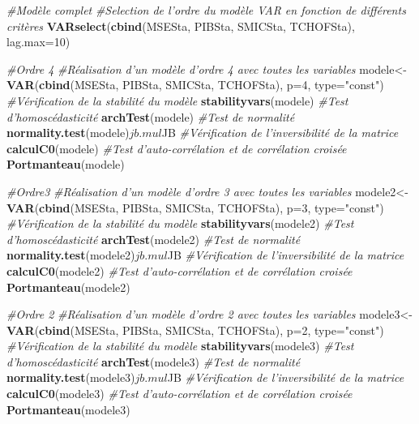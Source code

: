 \documentclass[11pt,]{article}
\newenvironment{Shaded}{\begin{snugshade}}{\end{snugshade}}
\newcommand{\KeywordTok}[1]{\textcolor[rgb]{0.13,0.29,0.53}{\textbf{{#1}}}}
\newcommand{\DataTypeTok}[1]{\textcolor[rgb]{0.13,0.29,0.53}{{#1}}}
\newcommand{\DecValTok}[1]{\textcolor[rgb]{0.00,0.00,0.81}{{#1}}}
\newcommand{\StringTok}[1]{\textcolor[rgb]{0.31,0.60,0.02}{{#1}}}
\newcommand{\CommentTok}[1]{\textcolor[rgb]{0.56,0.35,0.01}{\textit{{#1}}}}
\newcommand{\NormalTok}[1]{{#1}}
\begin{document}
\begin{Shaded}
\begin{Highlighting}[]
\CommentTok{#Modèle complet}
\CommentTok{#Selection de l'ordre du modèle VAR en fonction de différents critères}
\KeywordTok{VARselect}\NormalTok{(}\KeywordTok{cbind}\NormalTok{(MSESta, PIBSta, SMICSta, TCHOFSta), }\DataTypeTok{lag.max=}\DecValTok{10}\NormalTok{)}

\CommentTok{#Ordre 4}
\CommentTok{#Réalisation d'un modèle d'ordre 4 avec toutes les variables}
\NormalTok{modele<-}\KeywordTok{VAR}\NormalTok{(}\KeywordTok{cbind}\NormalTok{(MSESta, PIBSta, SMICSta, TCHOFSta), }\DataTypeTok{p=}\DecValTok{4}\NormalTok{, }\DataTypeTok{type=}\StringTok{"const"}\NormalTok{)}
\CommentTok{#Vérification de la stabilité du modèle}
\KeywordTok{stabilityvars}\NormalTok{(modele)}
\CommentTok{#Test d'homoscédasticité}
\KeywordTok{archTest}\NormalTok{(modele)}
\CommentTok{#Test de normalité}
\KeywordTok{normality.test}\NormalTok{(modele)$jb.mul$JB}
\CommentTok{#Vérification de l'inversibilité de la matrice}
\KeywordTok{calculC0}\NormalTok{(modele)}
\CommentTok{#Test d'auto-corrélation et de corrélation croisée}
\KeywordTok{Portmanteau}\NormalTok{(modele)}

\CommentTok{#Ordre3}
\CommentTok{#Réalisation d'un modèle d'ordre 3 avec toutes les variables}
\NormalTok{modele2<-}\KeywordTok{VAR}\NormalTok{(}\KeywordTok{cbind}\NormalTok{(MSESta, PIBSta, SMICSta, TCHOFSta), }\DataTypeTok{p=}\DecValTok{3}\NormalTok{, }\DataTypeTok{type=}\StringTok{"const"}\NormalTok{)}
\CommentTok{#Vérification de la stabilité du modèle}
\KeywordTok{stabilityvars}\NormalTok{(modele2)}
\CommentTok{#Test d'homoscédasticité}
\KeywordTok{archTest}\NormalTok{(modele2)}
\CommentTok{#Test de normalité}
\KeywordTok{normality.test}\NormalTok{(modele2)$jb.mul$JB}
\CommentTok{#Vérification de l'inversibilité de la matrice}
\KeywordTok{calculC0}\NormalTok{(modele2)}
\CommentTok{#Test d'auto-corrélation et de corrélation croisée}
\KeywordTok{Portmanteau}\NormalTok{(modele2)}

\CommentTok{#Ordre 2}
\CommentTok{#Réalisation d'un modèle d'ordre 2 avec toutes les variables}
\NormalTok{modele3<-}\KeywordTok{VAR}\NormalTok{(}\KeywordTok{cbind}\NormalTok{(MSESta, PIBSta, SMICSta, TCHOFSta), }\DataTypeTok{p=}\DecValTok{2}\NormalTok{, }\DataTypeTok{type=}\StringTok{"const"}\NormalTok{)}
\CommentTok{#Vérification de la stabilité du modèle}
\KeywordTok{stabilityvars}\NormalTok{(modele3)}
\CommentTok{#Test d'homoscédasticité}
\KeywordTok{archTest}\NormalTok{(modele3)}
\CommentTok{#Test de normalité}
\KeywordTok{normality.test}\NormalTok{(modele3)$jb.mul$JB}
\CommentTok{#Vérification de l'inversibilité de la matrice}
\KeywordTok{calculC0}\NormalTok{(modele3)}
\CommentTok{#Test d'auto-corrélation et de corrélation croisée}
\KeywordTok{Portmanteau}\NormalTok{(modele3)}


\end{Highlighting}
\end{Shaded}
\end{document}

